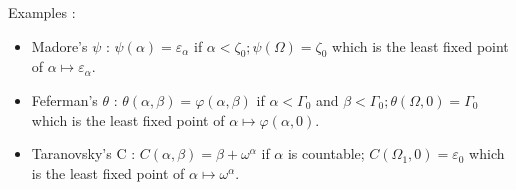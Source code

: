 \documentclass[8pt]{article}
\begin{document}
Examples :
\vspace{-0.4cm}
\smallskip
\begin{itemize}
     \setlength{\itemsep}{1pt}
     \setlength{\parskip}{0pt}
     \setlength{\parsep}{0pt}
\item Madore's \(\psi\) : \(\psi(\alpha) = \varepsilon_\alpha \) if \(\alpha < \zeta_0 ; \psi(\Omega) = \zeta_0 \) which is the least fixed point of \( \alpha \mapsto \varepsilon_\alpha \).
\vspace{-0.1cm}
\item Feferman's \(\theta\) : \(\theta(\alpha,\beta) = \varphi(\alpha,\beta) \) if \( \alpha < \Gamma_0 \) and \( \beta < \Gamma_0 ; \theta(\Omega,0) = \Gamma_0 \) which is the least fixed point of \( \alpha \mapsto \varphi(\alpha,0) \).
\vspace{-0.1cm}
\item Taranovsky's C : \( C(\alpha,\beta) = \beta+\omega^\alpha \) if \( \alpha \) is countable; \( C(\Omega_1,0) = \varepsilon_0 \) which is the least fixed point of \( \alpha \mapsto \omega^\alpha \).
\end{itemize}

\vspace{0.1cm}
\end{document}
